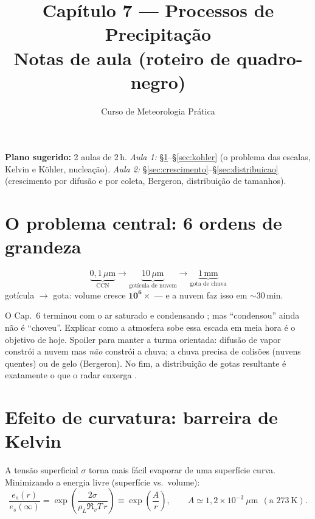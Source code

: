 \documentclass[11pt]{article}
\title{Capítulo 7 --- Processos de Precipitação\\
{\large Notas de aula (roteiro de quadro-negro)}}
\author{Curso de Meteorologia Prática}
\date{}
\begin{document}
\maketitle
\thispagestyle{fancy}

\noindent\textbf{Plano sugerido:} 2 aulas de 2\,h.
\emph{Aula 1:} \S\ref{sec:problema}--\S\ref{sec:kohler} (o problema das
escalas, Kelvin e Köhler, nucleação).
\emph{Aula 2:} \S\ref{sec:crescimento}--\S\ref{sec:distribuicao}
(crescimento por difusão e por coleta, Bergeron, distribuição de
tamanhos).

\section{O problema central: 6 ordens de grandeza}\label{sec:problema}

\begin{noquadro}
\[ \underbrace{0{,}1\,\mu\text{m}}_{\text{CCN}} \to
   \underbrace{10\,\mu\text{m}}_{\text{gotícula de nuvem}} \to
   \underbrace{1\,\text{mm}}_{\text{gota de chuva}} \]
gotícula $\to$ gota: volume cresce $\mathbf{10^6}\times$\quad
— e a nuvem faz isso em $\sim$30\,min.
\end{noquadro}

O Cap.~6 terminou com o ar saturado e condensando
; mas ``condensou'' ainda não é
``choveu''. Explicar como a atmosfera sobe essa escada em meia hora é o
objetivo de hoje. Spoiler para manter a turma orientada: difusão de
vapor constrói a nuvem mas \emph{não} constrói a chuva; a chuva precisa
de colisões (nuvens quentes) ou de gelo (Bergeron). No fim, a
distribuição de gotas resultante é exatamente o que o radar enxerga
.

\section{Efeito de curvatura: barreira de Kelvin}\label{sec:kelvin}


\begin{formadif}
A tensão superficial $\sigma$ torna mais fácil evaporar de uma
superfície curva. Minimizando a energia livre (superfície vs.\ volume):
\[ \frac{e_s(r)}{e_s(\infty)} =
\exp\!\left(\frac{2\sigma}{\rho_L \Re_v T\, r}\right)
 \equiv \exp\!\left(\frac{A}{r}\right),\qquad
A \simeq 1{,}2\times10^{-3}\ \mu\mathrm{m}\ \ (\text{a }273\ \mathrm{K}). \]
\end{formadif}
\end{document}
